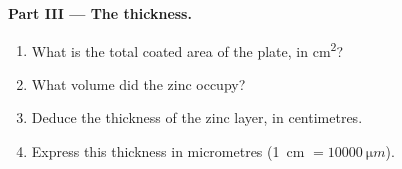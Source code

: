 \begin{problem}
\medskip
\noindent\textbf{Part III --- The thickness.}
\begin{enumerate}[resume]
  \item What is the total coated area of the plate, in \unit{cm^2}?
  \item What volume did the zinc occupy?
  \item Deduce the thickness of the zinc layer, in centimetres.
  \item Express this thickness in micrometres
        (\qty{1}{cm} $= \qty{10000}{\micro m}$).
\end{enumerate}
\end{problem}
